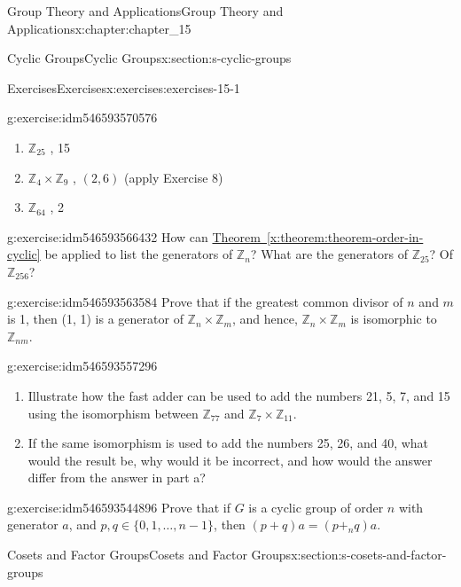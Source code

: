 \documentclass[oneside,10pt,]{book}
\newcommand{\xreffont}{\relax}
\numberwithin{equation}{section}
\begin{document}
\begin{chapterptx}{Group Theory and Applications}{}{Group Theory and Applications}{}{}{x:chapter:chapter_15}
\begin{sectionptx}{Cyclic Groups}{}{Cyclic Groups}{}{}{x:section:s-cyclic-groups}
\begin{exercises-subsection}{Exercises}{}{Exercises}{}{}{x:exercises:exercises-15-1}
\begin{divisionexercise}{6}{}{}{g:exercise:idm546593570576}
\begin{enumerate}[label=(\alph*)]
\item{}\(\mathbb{Z}_{25}\) , 15%
\item{}\(\mathbb{Z}_4\times \mathbb{Z}_9\) , \((2, 6)\) (apply Exercise 8)%
\item{}\(\mathbb{Z}_{64}\) , 2%
\end{enumerate}
%
\end{divisionexercise}%
\begin{divisionexercise}{7}{}{}{g:exercise:idm546593566432}%
How can \hyperref[x:theorem:theorem-order-in-cyclic]{Theorem~{\xreffont\ref{x:theorem:theorem-order-in-cyclic}}} be applied to list the generators of \(\mathbb{Z}_n\)? What are the generators of \(\mathbb{Z}_{25}\)? Of \(\mathbb{Z}_{256}\)?%
\end{divisionexercise}%
\begin{divisionexercise}{8}{}{}{g:exercise:idm546593563584}%
Prove that if the greatest common divisor of \(n\) and \(m\) is 1, then (1, 1) is a generator of \(\mathbb{Z}_n\times \mathbb{Z}_m\), and hence, \(\mathbb{Z}_n\times \mathbb{Z}_m\) is isomorphic to  \(\mathbb{Z}_{n m}\).%
\end{divisionexercise}%
\begin{divisionexercise}{9}{}{}{g:exercise:idm546593557296}%
%
\begin{enumerate}[label=(\alph*)]
\item{}Illustrate how the fast adder can be used to add the numbers 21, 5, 7, and 15 using the isomorphism between \(\mathbb{Z}_{77}\) and \(\mathbb{Z}_7\times \mathbb{Z}_{11}\).%
\item{}If the same isomorphism is used to add the numbers 25, 26, and 40, what would the result be, why would it be incorrect, and how would the answer differ from the answer in part a?%
\end{enumerate}
%
\end{divisionexercise}%
\begin{divisionexercise}{10}{}{}{g:exercise:idm546593544896}%
Prove that if \(G\) is a cyclic group of order \(n\) with generator \(a\), and \(p, q \in  \{0, 1, \ldots , n - 1\}\), then \((p+q)a = \left(p+_nq\right)a\).%
\end{divisionexercise}%
\end{exercises-subsection}
\end{sectionptx}
%
%
\typeout{************************************************}
\typeout{************************************************}
%
\begin{sectionptx}{Cosets and Factor Groups}{}{Cosets and Factor Groups}{}{}{x:section:s-cosets-and-factor-groups}

\end{sectionptx}
\end{chapterptx}
\end{document}
